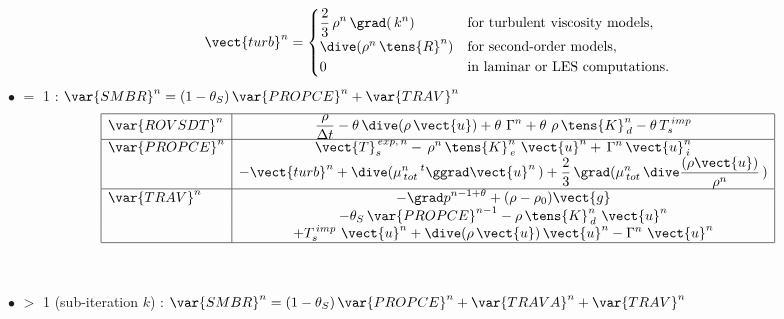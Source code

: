\begin{equation}\notag
\vect{turb}^{n}=
\begin{cases}
\displaystyle\frac {2}{3}\,\rho^{n}\,\grad (\,k^{n}) &
\text{for turbulent viscosity models}, \\
\dive(\rho^{n}\,\tens{R}^n) & \text{for second-order models},\\
0 & \text{in laminar or LES computations.}\\
\end{cases}
\end{equation}
$\bullet$  $=$ 1 : $\var{SMBR}^n=(1-\theta_S)\,\var{PROPCE}^n+\var{TRAV}^n$
\begin{equation}\label{Base_Predvv_tab_ext0}
\begin{array}{|l|c|}
\hline
\var{ROVSDT}^{n}
& \displaystyle
\frac{\rho}{\Delta t} -\theta \,\dive (\rho\,\vect {u}) +\theta \,\, \Gamma^n + \theta \,\, \rho\,\tens{K}_{\,d}^n-\theta \,T_s^{\,imp} \\
\hline
\var{PROPCE}^{n}
& \displaystyle
\vect{T}_{s}^{\,exp,\,n}-\,\rho^{n}\,\tens{K}_{\,e}^{n}\ \vect{u}^{n} + \,\Gamma^{n}\,\vect{u}_{\,i}^{n}\\
& \displaystyle
-\vect{turb}^{n}+ \dive (\mu_{\,tot}^{n}\,^t\ggrad \vect {u}^{n}\,)+ \frac {2} {3}\,\grad (\mu_{\,tot}^{n}\,\dive \frac{(\rho \vect {u})}{\rho^{n}}\,)\\
\hline
\var{TRAV}^{n} & \displaystyle
- \grad p^{n-1+\theta} + (\rho -\rho_0) \vect {g} \\
& \displaystyle
-\theta_S\,\var{PROPCE}^{n-1} -\rho\,\tens{K}_{\,d}^n\ \vect{u}^{n} \\
& \displaystyle
+ T_s^{\,imp}\,\,\vect {u}^{n} + \dive (\rho\,\vect {u})\,\vect{u}^{n} - \Gamma^n\,\,\vect{u}^{n}\\
\hline
\end{array}
\end{equation}
\\\\
$\bullet$  $>$ 1 (sub-iteration $k$) : $\var{SMBR}^n=(1-\theta_S)\,\var{PROPCE}^n+\var{TRAVA}^n+\var{TRAV}^n$
